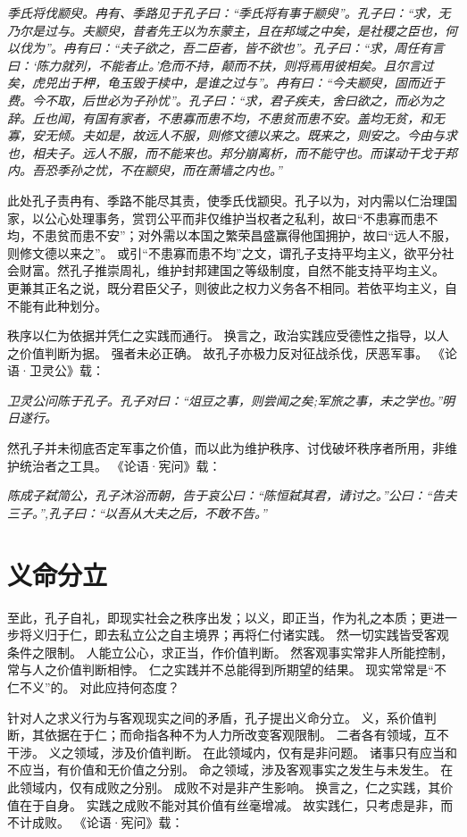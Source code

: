 \documentclass[11pt]{article}
\begin{document}
\textit{季氏将伐颛臾。冉有、季路见于孔子曰：“季氏将有事于颛臾”。孔子曰：“求，无乃尔是过与。夫颛臾，昔者先王以为东蒙主，且在邦域之中矣，是社稷之臣也，何以伐为”。冉有曰：“夫子欲之，吾二臣者，皆不欲也”。孔子曰：“求，周任有言曰：‘陈力就列，不能者止。’危而不持，颠而不扶，则将焉用彼相矣。且尔言过矣，虎兕出于柙，龟玉毁于椟中，是谁之过与”。冉有曰：“今夫颛臾，固而近于费。今不取，后世必为子孙忧”。孔子曰：“求，君子疾夫，舍曰欲之，而必为之辞。丘也闻，有国有家者，不患寡而患不均，不患贫而患不安。盖均无贫，和无寡，安无倾。夫如是，故远人不服，则修文德以来之。既来之，则安之。今由与求也，相夫子。远人不服，而不能来也。邦分崩离析，而不能守也。而谋动干戈于邦内。吾恐季孙之忧，不在颛臾，而在萧墙之内也。”}

此处孔子责冉有、季路不能尽其责，使季氏伐颛臾。孔子以为，对内需以仁治理国家，以公心处理事务，赏罚公平而非仅维护当权者之私利，故曰“不患寡而患不均，不患贫而患不安”；对外需以本国之繁荣昌盛赢得他国拥护，故曰“远人不服，则修文德以来之”。
或引“不患寡而患不均”之文，谓孔子支持平均主义，欲平分社会财富。然孔子推崇周礼，维护封邦建国之等级制度，自然不能支持平均主义。
更兼其正名之说，既分君臣父子，则彼此之权力义务各不相同。若依平均主义，自不能有此种划分。

\par

秩序以仁为依据并凭仁之实践而通行。
换言之，政治实践应受德性之指导，以人之价值判断为据。
强者未必正确。
故孔子亦极力反对征战杀伐，厌恶军事。
《论语·卫灵公》载：

\textit{卫灵公问陈于孔子。孔子对曰：“俎豆之事，则尝闻之矣;军旅之事，未之学也。”明日遂行。}

然孔子并未彻底否定军事之价值，而以此为维护秩序、讨伐破坏秩序者所用，非维护统治者之工具。
《论语·宪问》载：

\textit{陈成子弑简公，孔子沐浴而朝，告于哀公曰：“陈恒弑其君，请讨之。”公曰：“告夫三子。”,孔子曰：“以吾从大夫之后，不敢不告。”}

\section{义命分立}
至此，孔子自礼，即现实社会之秩序出发；以义，即正当，作为礼之本质；更进一步将义归于仁，即去私立公之自主境界；再将仁付诸实践。
然一切实践皆受客观条件之限制。
人能立公心，求正当，作价值判断。
然客观事实常非人所能控制，常与人之价值判断相悖。
仁之实践并不总能得到所期望的结果。
现实常常是“不仁不义”的。
对此应持何态度？

\par

针对人之求义行为与客观现实之间的矛盾，孔子提出义命分立。
义，系价值判断，其依据在于仁；而命指各种不为人力所改变客观限制。
二者各有领域，互不干涉。
义之领域，涉及价值判断。
在此领域内，仅有是非问题。
诸事只有应当和不应当，有价值和无价值之分别。
命之领域，涉及客观事实之发生与未发生。
在此领域内，仅有成败之分别。
成败不对是非产生影响。
换言之，仁之实践，其价值在于自身。
实践之成败不能对其价值有丝毫增减。
故实践仁，只考虑是非，而不计成败。
《论语·宪问》载：
\end{document}
